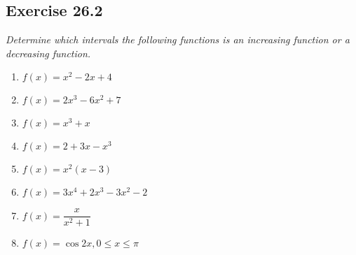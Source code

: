 \subsection{Exercise 26.2}

\noindent \hspace{1.2em}\textit{Determine which intervals the following functions is an increasing function or a decreasing function.}
\begin{enumerate}
    \item $f(x)=x^2-2 x+4$
    \item $f(x)=2 x^3-6 x^2+7$
    \item $f(x)=x^3+x$
    \item $f(x)=2+3 x-x^3$
    \item $f(x)=x^2(x-3)$
    \item $f(x)=3 x^4+2 x^3-3 x^2-2$
    \item $f(x)=\dfrac{x}{x^2+1}$
    \item $f(x)=\cos 2 x, 0 \leq x \leq \pi$
\end{enumerate}